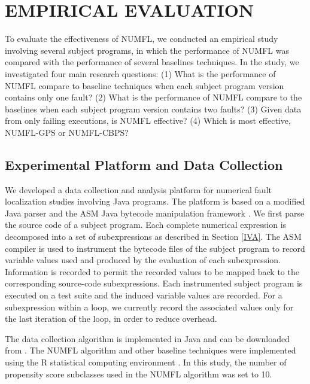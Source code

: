 \documentclass[times]{stvrauth}
\begin{document}
\section{EMPIRICAL EVALUATION}\label{evaluation}
To evaluate the effectiveness of NUMFL, we conducted an empirical study involving several subject programs, in which the performance of NUMFL was compared with the performance of several baselines techniques. In the study, we investigated four main research questions:  (1) What is the performance of NUMFL compare to baseline techniques when each subject program version contains only one fault?  (2) What is the performance of NUMFL compare to the baselines when each subject program version contains two faults?   (3) Given data from only failing executions, is NUMFL effective?  (4) Which is most effective, NUMFL-GPS or NUMFL-CBPS?

\subsection{Experimental Platform and Data Collection}
We developed a data collection and analysis platform for numerical fault localization studies involving Java programs.  The platform is based on a modified Java parser \cite{Java} and the ASM Java bytecode manipulation framework \cite{ASM}.  We first parse the source code of a subject program.  Each complete numerical expression is decomposed into a set of subexpressions as described in Section \ref{IVA}.  The ASM compiler is used to instrument the bytecode files of the subject program to record variable values used and produced by the evaluation of each subexpression.  Information is recorded to permit the recorded values to be mapped back to the corresponding source-code subexpressions.  Each instrumented subject program is executed on a test suite and the induced variable values are recorded.  For a subexpression within a loop, we currently record the associated values only for the last iteration of the loop, in order to reduce overhead.

The data collection algorithm is implemented in Java and can be downloaded from \cite{NUMFL}.  The NUMFL algorithm and other baseline techniques were implemented using the R statistical computing environment \cite{R}. In this study, the number of propensity score subclasses used in the NUMFL algorithm was set to 10.
\end{document}

